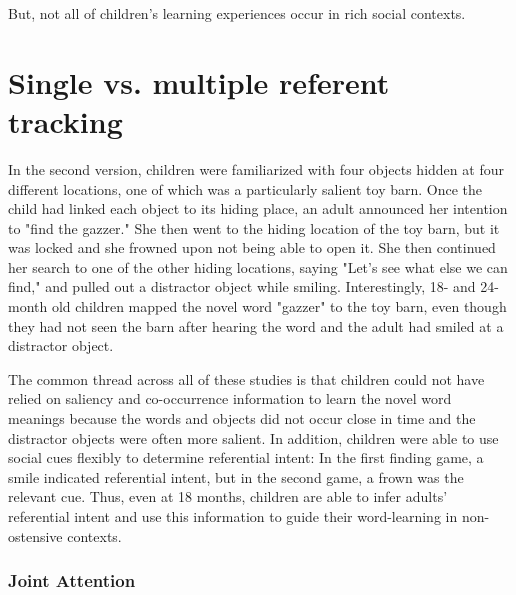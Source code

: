 \documentclass[man]{apa2}
\begin{document}
But, not all of children's learning experiences occur in rich social contexts. 





\section{Single vs. multiple referent tracking}





In the second version, children were familiarized with four objects hidden at four different locations, one of which was a particularly salient toy barn. Once the child had linked each object to its hiding place, an adult announced her intention to "find the gazzer." She then went to the hiding location of the toy barn, but it was locked and she frowned upon not being able to open it. She then continued her search to one of the other hiding locations, saying "Let's see what else we can find," and pulled out a distractor object while smiling. Interestingly, 18- and 24-month old children mapped the novel word "gazzer" to the toy barn, even though they had not seen the barn after hearing the word and the adult had smiled at a distractor object. 

The common thread across all of these studies is that children could not have relied on saliency and co-occurrence information to learn the novel word meanings because the words and objects did not occur close in time and the distractor objects were often more salient. In addition, children were able to use social cues flexibly to determine referential intent: In the first finding game, a smile indicated referential intent, but in the second game, a frown was the relevant cue. Thus, even at 18 months, children are able to infer adults' referential intent and use this information to guide their word-learning in non-ostensive contexts.

\subsubsection{Joint Attention}
\end{document}
